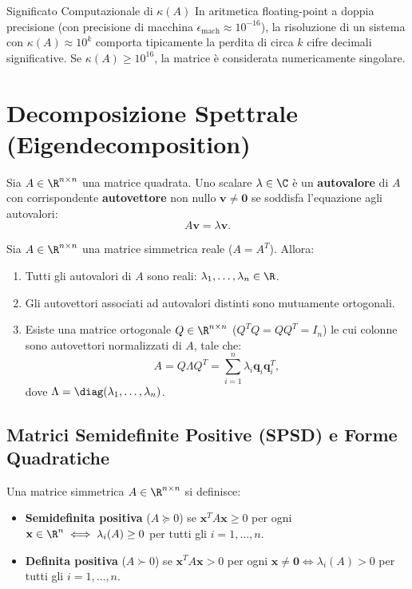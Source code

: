 \begin{alertblock}{Significato Computazionale di $\kappa(A)$}
In aritmetica floating-point a doppia precisione (con precisione di macchina $\epsilon_{\text{mach}} \approx 10^{-16}$), la risoluzione di un sistema con $\kappa(A) \approx 10^k$ comporta tipicamente la perdita di circa $k$ cifre decimali significative. Se $\kappa(A) \ge 10^{16}$, la matrice è considerata numericamente singolare.
\end{alertblock}

\FloatBarrier
\section{Decomposizione Spettrale (Eigendecomposition)}

Sia $A \in \R^{n \times n}$ una matrice quadrata. Uno scalare $\lambda \in \C$ è un \textbf{autovalore} di $A$ con corrispondente \textbf{autovettore} non nullo $\mathbf{v} \ne \mathbf{0}$ se soddisfa l'equazione agli autovalori:
\begin{equation}
    A \mathbf{v} = \lambda \mathbf{v}.
\end{equation}

\begin{theorem}
Sia $A \in \R^{n \times n}$ una matrice simmetrica reale ($A = A^T$). Allora:
\begin{enumerate}
    \item Tutti gli autovalori di $A$ sono reali: $\lambda_1, \dots, \lambda_n \in \R$.
    \item Gli autovettori associati ad autovalori distinti sono mutuamente ortogonali.
    \item Esiste una matrice ortogonale $Q \in \R^{n \times n}$ ($Q^T Q = Q Q^T = I_n$) le cui colonne sono autovettori normalizzati di $A$, tale che:
    \begin{equation}
        A = Q \Lambda Q^T = \sum_{i=1}^n \lambda_i \mathbf{q}_i \mathbf{q}_i^T,
    \end{equation}
    dove $\Lambda = \diag(\lambda_1, \dots, \lambda_n)$.
\end{enumerate}
\end{theorem}

\subsection{Matrici Semidefinite Positive (SPSD) e Forme Quadratiche}

Una matrice simmetrica $A \in \R^{n \times n}$ si definisce:
\begin{itemize}
    \item \textbf{Semidefinita positiva} ($A \succeq 0$) se $\mathbf{x}^T A \mathbf{x} \ge 0$ per ogni $\mathbf{x} \in \R^n \iff \lambda_i(A) \ge 0$ per tutti gli $i=1,\dots,n$.
    \item \textbf{Definita positiva} ($A \succ 0$) se $\mathbf{x}^T A \mathbf{x} > 0$ per ogni $\mathbf{x} \ne \mathbf{0} \iff \lambda_i(A) > 0$ per tutti gli $i=1,\dots,n$.
\end{itemize}

